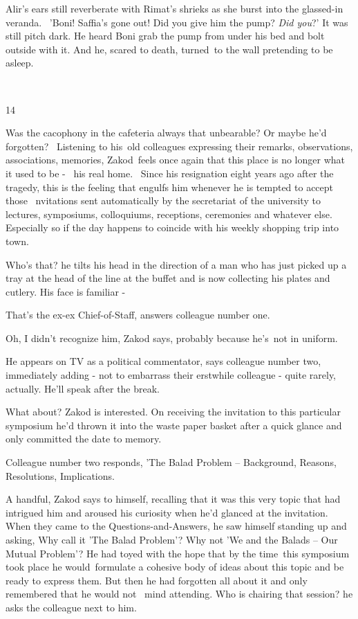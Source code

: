 \documentclass[12pt]{book}
\begin{document}
Alir's ears still reverberate with Rimat's shrieks as she burst into the glassed-in veranda. \ {}'Boni! Saffia's gone
out! Did you give him the pump? \textit{Did you}?' It was still pitch dark. He heard Boni grab the pump from under his
bed and bolt outside with it. And he, scared to death, turned~to the wall pretending to be asleep.

~

14

Was the cacophony in the cafeteria always that unbearable? Or maybe he'd forgotten? ~Listening to his~old colleagues
expressing their remarks, observations, associations, memories, Zakod~feels once again that this place is no longer
what it used to be -~ his real home. ~Since his resignation eight years ago after the tragedy, this is the feeling that
engulfs him whenever he is tempted to accept those \ nvitations sent automatically by the secretariat of the university
to lectures, symposiums, colloquiums, receptions, ceremonies and whatever else. Especially so if the day happens to
coincide with his weekly shopping trip into town.

{\textquotedbl}Who's that?{\textquotedbl} he tilts his head in the direction of a man who has just picked up a tray at
the head of the line at the buffet and is now collecting his plates and cutlery. {\textquotedbl}His face is familiar
-{\textquotedbl}

{\textquotedbl}That's the ex-ex Chief-of-Staff,{\textquotedbl} answers colleague number one.

{\textquotedbl}Oh, I didn't recognize him,{\textquotedbl} Zakod says, {\textquotedbl}probably because he's~not in
uniform.{\textquotedbl} ~

{\textquotedbl}He appears on TV as a political commentator,{\textquotedbl} says colleague number two, immediately adding
- not to embarrass their erstwhile colleague - {\textquotedbl}quite rarely, actually. He'll speak after the
break.{\textquotedbl}

{\textquotedbl}What about?{\textquotedbl} Zakod is interested. On receiving the invitation to this particular symposium
he'd thrown it into the waste paper basket after a quick glance and only committed the date to memory.

Colleague number two responds, {\textquotedbl}'The Balad Problem -- Background, Reasons, Resolutions,
Implications.{\textquotedbl}

A handful, Zakod says to himself, recalling that it was this very topic that had intrigued him and aroused his curiosity
when he'd glanced at the invitation. When they{ }came{ }to the
Questions-and-Answers{, }he saw himself standing up and asking, {\textquotedbl}Why call it 'The Balad
Problem'? Why not 'We and the Balads -- Our Mutual Problem'?{\textquotedbl} He had toyed with the hope that by the
time~this symposium{ }took place he would~formulate a cohesive body of ideas about this topic and be
ready to express them. But then he had forgotten all about it and only remembered that he would not \ mind attending.
{\textquotedbl}Who is chairing that session?{\textquotedbl} he asks the colleague next to him.
\end{document}
